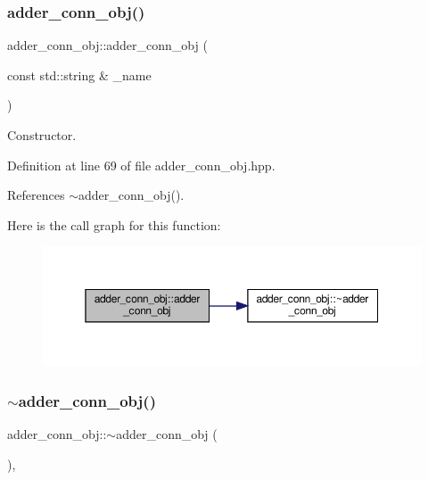 \subsubsection{\texorpdfstring{adder\+\_\+conn\+\_\+obj()}{adder\_conn\_obj()}}
{\footnotesize\ttfamily adder\+\_\+conn\+\_\+obj\+::adder\+\_\+conn\+\_\+obj (\begin{DoxyParamCaption}\item[{const std\+::string \&}]{\+\_\+name }\end{DoxyParamCaption})\hspace{0.3cm}{\ttfamily [inline]}}



Constructor. 



Definition at line 69 of file adder\+\_\+conn\+\_\+obj.\+hpp.



References $\sim$adder\+\_\+conn\+\_\+obj().

Here is the call graph for this function\+:
\nopagebreak
\begin{figure}[H]
\begin{center}
\leavevmode
\includegraphics[width=350pt]{da/dea/classadder__conn__obj_afcde492f8237c3aec85536b4e85276b4_cgraph}
\end{center}
\end{figure}
\mbox{\label{classadder__conn__obj_a3d39a846cd2b74f7895927bf9c63e116}} 
\subsubsection{\texorpdfstring{$\sim$adder\+\_\+conn\+\_\+obj()}{~adder\_conn\_obj()}}
{\footnotesize\ttfamily adder\+\_\+conn\+\_\+obj\+::$\sim$adder\+\_\+conn\+\_\+obj (\begin{DoxyParamCaption}{ }\end{DoxyParamCaption})\hspace{0.3cm}{\ttfamily [override]}, {\ttfamily [default]}}



